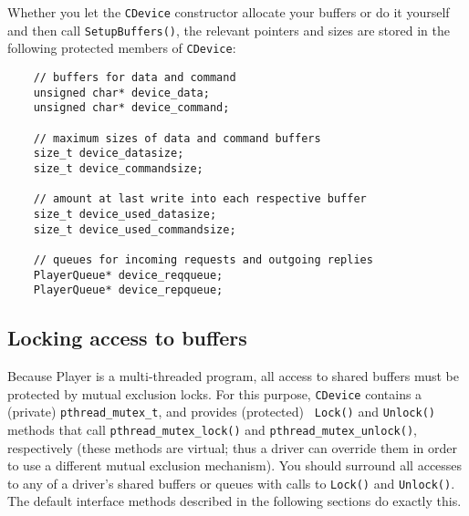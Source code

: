 \documentclass[11pt]{report}
\begin{document}
Whether you let the {\tt CDevice} constructor allocate your buffers or do it
yourself and then call {\tt SetupBuffers()}, the relevant pointers and sizes
are stored in the following protected members of {\tt CDevice}:
\begin{verbatim}
    // buffers for data and command
    unsigned char* device_data;
    unsigned char* device_command;

    // maximum sizes of data and command buffers
    size_t device_datasize;
    size_t device_commandsize;

    // amount at last write into each respective buffer
    size_t device_used_datasize;
    size_t device_used_commandsize;
    
    // queues for incoming requests and outgoing replies
    PlayerQueue* device_reqqueue;
    PlayerQueue* device_repqueue;
\end{verbatim}

\subsection{Locking access to buffers}
Because Player is a multi-threaded program, all access to shared buffers
must be protected by mutual exclusion locks.  For this purpose, {\tt CDevice}
contains a (private) {\tt pthread\_mutex\_t}, and provides (protected) {\tt
Lock()} and {\tt Unlock()} methods that call {\tt pthread\_mutex\_lock()}
and {\tt pthread\_mutex\_unlock()}, respectively (these methods are virtual;
thus a driver can override them in order to use a different mutual exclusion
mechanism).  You should surround all accesses to any of a driver's shared
buffers or queues with calls to {\tt Lock()} and {\tt Unlock()}.  The default
interface methods described in the following sections do exactly this.
\end{document}
